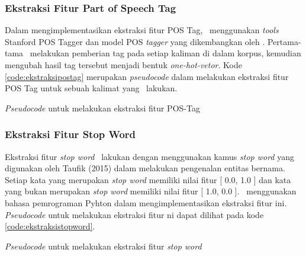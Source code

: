 \subsubsection{Ekstraksi Fitur Part of Speech Tag}
Dalam mengimplementasikan ekstraksi fitur POS Tag, \saya~menggunakan \textit{tools} Stanford POS Tagger dan model POS \textit{tagger} yang dikembangkan oleh \cite{dinakaramani2014designing}. Pertama-tama \saya~melakukan pemberian tag pada setiap kaliman di dalam korpus, kemudian mengubah hasil tag tersebut menjadi bentuk \textit{one-hot-vetor}. Kode \ref{code:ekstraksipostag} merupakan \textit{pseudocode} dalam melakukan ekstraksi fitur POS Tag untuk sebuah kalimat yang \saya~lakukan.

\begin{kode}
	
	
	\caption{\textit{Pseudocode} untuk melakukan ekstraksi fitur POS-Tag}
	\label{code:ekstraksipostag}
\end{kode}

\subsubsection{Ekstraksi Fitur Stop Word}
Ekstraksi fitur \textit{stop word} \saya~lakukan dengan menggunakan kamus \textit{stop word} yang digunakan oleh Taufik (2015) dalam melakukan pengenalan entitas bernama. Setiap kata yang merupakan \textit{stop word} memiliki nilai fitur [ 0.0, 1.0 ] dan kata yang bukan merupakan \textit{stop word} memiliki nilai fitur [ 1.0, 0.0 ]. \Saya~menggunakan bahasa pemrograman Pyhton dalam mengimplementasikan ekstraksi fitur ini.
\textit{Pseudocode} untuk melakukan ekstraksi fitur ni dapat dilihat pada kode \ref{code:ekstraksistopword}.

\begin{kode}

	
	
	\caption{\textit{Pseudocode} untuk melakukan ekstraksi fitur \textit{stop word}}
	\label{code:ekstraksistopword}	
\end{kode}

